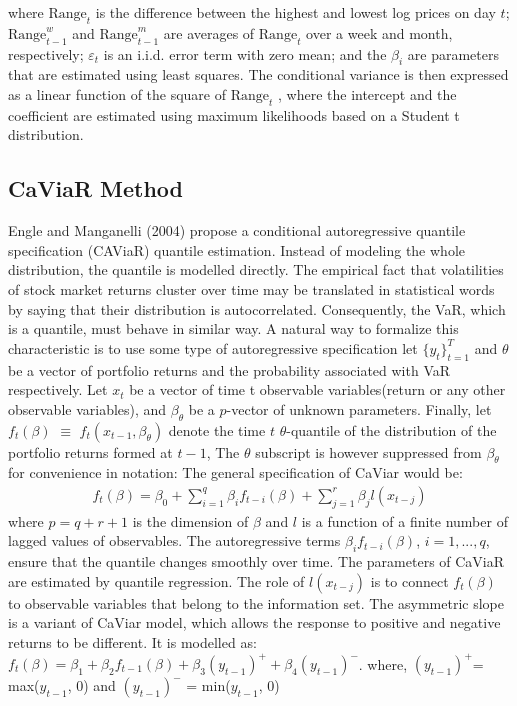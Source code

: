 \documentclass[a4paper,11pt,oneside]{book}
\begin{document}
where $\text{Range}_{t}$
is the difference between the highest and
lowest log prices on day $t$; $\text{Range}^{w}_{t-1}$
and $\text{Range}^{m}_{t-1}$ are
averages of $\text{Range}_{t}$ over a week and month, respectively;
$\varepsilon_t$
is an i.i.d. error term with zero mean; and the $\beta_{i}$
are parameters that are estimated using least squares.
The conditional variance is then expressed as a linear
function of the square of $\text{Range}_{t}$
, where the intercept and
the coefficient are estimated using maximum likelihoods
based on a Student t distribution.


\subsection{CaViaR Method}
Engle and Manganelli (2004) propose a conditional autoregressive quantile specification (CAViaR) quantile estimation. Instead of modeling the whole distribution, the quantile is modelled directly. The empirical fact that volatilities of stock market returns cluster over time may be translated in statistical words by saying that their distribution is autocorrelated. Consequently, the VaR, which is a quantile, must behave in similar way. A natural way to formalize this characteristic is to use some type of autoregressive specification
\newline\newline
let $\{y_t\}^T_{t=1}$ and $\theta$ be a vector of portfolio returns and the probability associated with VaR respectively. Let $x_t$ be a vector of time t observable variables(return or any other observable variables), and ${\beta}_\theta$ be a $p$-vector of unknown parameters. Finally, let $f_t(\beta) $ $\equiv$ $ f_t(x_{t-1},{\beta}_\theta)$ denote the time $t$ $\theta$-quantile of the distribution of the portfolio returns formed at $t-1$, The $\theta$ subscript is however suppressed from $\beta_\theta$ for convenience in notation: The general specification of CaViar would be:
\begin{equation}
\begin{aligned}
f_t(\beta)=\beta_0 + \sum_{i=1}^{q} \beta_{i}f _{t-i}(\beta) +\sum_{j=1}^{r}\beta_{j}l(x_{t-j})
\label{5}
\end{aligned}
\end{equation}
where $p=q+r+1$ is the dimension of $\beta$ and $l$ is a function of a finite number of lagged values of observables. The autoregressive terms $\beta_{i}f_{t-i}(\beta)$, $i = 1,...,q$, ensure that the quantile changes smoothly over time. The parameters of CaViaR are estimated by quantile regression. The role of $l(x_{t-j})$ is to connect $f_{t}(\beta)$ to observable variables that belong to the information set.
\newline\newline
The asymmetric slope is a variant of CaViar model, which allows the response to positive and negative returns to be different. It is modelled as:\newline\newline
$f_{t}(\beta)= \beta_{1} +\beta_{2}f_{t-1}(\beta)+\beta_{3}(y_{t-1})^{+} + \beta_{4}(y_{t-1})^{-}$. where, $(y_{t-1})^{+}$= max($y_{t-1}$, 0) and $(y_{t-1})^{-}$ = min($y_{t-1}$, 0)
\end{document}
